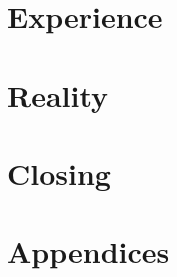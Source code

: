 \documentclass{article}
\begin{document}
\part{Experience}








\part{Reality}











\part{Closing}





\appendix
\part{Appendices}






\clearpage
{}
\nocite{*}


\end{document}
